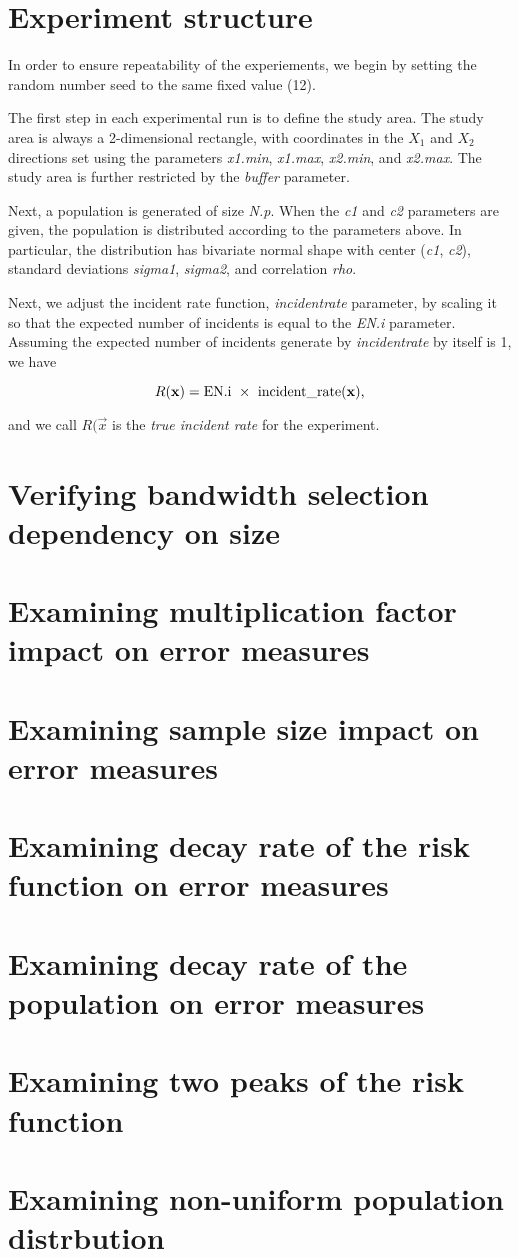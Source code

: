 \section{Experiment structure}
\label{sec:method_experiment_structure}

In order to ensure repeatability of the experiements, we begin by setting the random number seed to the same fixed value (12).

The first step in each experimental run is to define the study area. 
The study area is always a 2-dimensional rectangle, with coordinates in the \(X_1\) and \(X_2\) directions set using the parameters \textit{x1.min}, \textit{x1.max}, \textit{x2.min}, and \textit{x2.max}.
The study area is further restricted by the \textit{buffer} parameter.

Next, a population is generated of size \textit{N.p}.
When the \textit{c1} and \textit{c2} parameters are given, the population is distributed according to the parameters above.
In particular, the distribution has bivariate normal shape with center (\textit{c1}, \textit{c2}),
standard deviations \textit{sigma1}, \textit{sigma2}, and correlation \textit{rho}.

Next, we adjust the incident rate function, \textit{incident\textunderscore rate} parameter, by scaling it so that the expected number of incidents is equal to the \textit{EN.i} parameter.
Assuming the expected number of incidents generate by \textit{incident\textunderscore rate} by itself is 1, we have

\[
    R(\vec{x}) = \mbox{EN.i}~\times~\mbox{incident\textunderscore rate}(\vec{x}) \text{,}
\]

and we call \(R(\vec{x}\) is the \textit{true incident rate} for the experiment.

\section{Verifying bandwidth selection dependency on size}

\section{Examining multiplication factor impact on error measures}

\section{Examining sample size impact on error measures}

\section{Examining decay rate of the risk function on error measures}

\section{Examining decay rate of the population on error measures}

\section{Examining two peaks of the risk function}

\section{Examining non-uniform population distrbution}